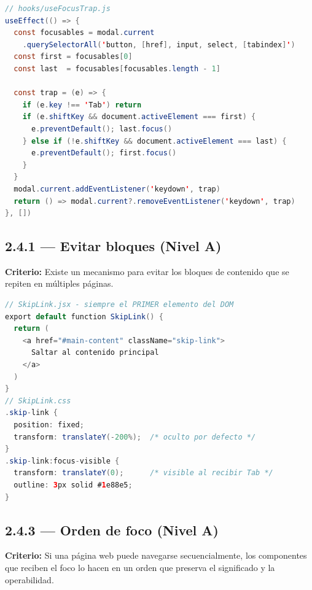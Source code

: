 \documentclass[12pt, a4paper]{article}
\begin{document}
\begin{evidbox}
\begin{lstlisting}[language=Java]
// hooks/useFocusTrap.js
useEffect(() => {
  const focusables = modal.current
    .querySelectorAll('button, [href], input, select, [tabindex]')
  const first = focusables[0]
  const last  = focusables[focusables.length - 1]

  const trap = (e) => {
    if (e.key !== 'Tab') return
    if (e.shiftKey && document.activeElement === first) {
      e.preventDefault(); last.focus()
    } else if (!e.shiftKey && document.activeElement === last) {
      e.preventDefault(); first.focus()
    }
  }
  modal.current.addEventListener('keydown', trap)
  return () => modal.current?.removeEventListener('keydown', trap)
}, [])
\end{lstlisting}
\end{evidbox}

\subsection{2.4.1 --- Evitar bloques (Nivel A)}

\textbf{Criterio:} Existe un mecanismo para evitar los bloques de contenido que se repiten en múltiples páginas.

\begin{evidbox}
\begin{lstlisting}[language=Java]
// SkipLink.jsx - siempre el PRIMER elemento del DOM
export default function SkipLink() {
  return (
    <a href="#main-content" className="skip-link">
      Saltar al contenido principal
    </a>
  )
}
// SkipLink.css
.skip-link {
  position: fixed;
  transform: translateY(-200%);  /* oculto por defecto */
}
.skip-link:focus-visible {
  transform: translateY(0);      /* visible al recibir Tab */
  outline: 3px solid #1e88e5;
}
\end{lstlisting}
\end{evidbox}

\subsection{2.4.3 --- Orden de foco (Nivel A)}

\textbf{Criterio:} Si una página web puede navegarse secuencialmente, los componentes que reciben el foco lo hacen en un orden que preserva el significado y la operabilidad.
\end{document}
